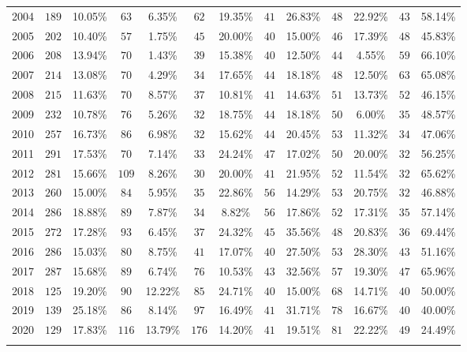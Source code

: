 \begin{table}[!htbp]
\begin{tabular}{@{\extracolsep{2pt}} ccccccccccccc}
2004 & $189$ & 10.05\% & $63$ & 6.35\% & $62$ & 19.35\% & $41$ & 26.83\% & $48$ & 22.92\% & $43$ & 58.14\% \\ 
2005 & $202$ & 10.40\% & $57$ & 1.75\% & $45$ & 20.00\% & $40$ & 15.00\% & $46$ & 17.39\% & $48$ & 45.83\% \\ 
2006 & $208$ & 13.94\% & $70$ & 1.43\% & $39$ & 15.38\% & $40$ & 12.50\% & $44$ & 4.55\% & $59$ & 66.10\% \\ 
2007 & $214$ & 13.08\% & $70$ & 4.29\% & $34$ & 17.65\% & $44$ & 18.18\% & $48$ & 12.50\% & $63$ & 65.08\% \\ 
2008 & $215$ & 11.63\% & $70$ & 8.57\% & $37$ & 10.81\% & $41$ & 14.63\% & $51$ & 13.73\% & $52$ & 46.15\% \\ 
2009 & $232$ & 10.78\% & $76$ & 5.26\% & $32$ & 18.75\% & $44$ & 18.18\% & $50$ & 6.00\% & $35$ & 48.57\% \\ 
2010 & $257$ & 16.73\% & $86$ & 6.98\% & $32$ & 15.62\% & $44$ & 20.45\% & $53$ & 11.32\% & $34$ & 47.06\% \\ 
2011 & $291$ & 17.53\% & $70$ & 7.14\% & $33$ & 24.24\% & $47$ & 17.02\% & $50$ & 20.00\% & $32$ & 56.25\% \\ 
2012 & $281$ & 15.66\% & $109$ & 8.26\% & $30$ & 20.00\% & $41$ & 21.95\% & $52$ & 11.54\% & $32$ & 65.62\% \\ 
2013 & $260$ & 15.00\% & $84$ & 5.95\% & $35$ & 22.86\% & $56$ & 14.29\% & $53$ & 20.75\% & $32$ & 46.88\% \\ 
2014 & $286$ & 18.88\% & $89$ & 7.87\% & $34$ & 8.82\% & $56$ & 17.86\% & $52$ & 17.31\% & $35$ & 57.14\% \\ 
2015 & $272$ & 17.28\% & $93$ & 6.45\% & $37$ & 24.32\% & $45$ & 35.56\% & $48$ & 20.83\% & $36$ & 69.44\% \\ 
2016 & $286$ & 15.03\% & $80$ & 8.75\% & $41$ & 17.07\% & $40$ & 27.50\% & $53$ & 28.30\% & $43$ & 51.16\% \\ 
2017 & $287$ & 15.68\% & $89$ & 6.74\% & $76$ & 10.53\% & $43$ & 32.56\% & $57$ & 19.30\% & $47$ & 65.96\% \\ 
2018 & $125$ & 19.20\% & $90$ & 12.22\% & $85$ & 24.71\% & $40$ & 15.00\% & $68$ & 14.71\% & $40$ & 50.00\% \\ 
2019 & $139$ & 25.18\% & $86$ & 8.14\% & $97$ & 16.49\% & $41$ & 31.71\% & $78$ & 16.67\% & $40$ & 40.00\% \\ 
2020 & $129$ & 17.83\% & $116$ & 13.79\% & $176$ & 14.20\% & $41$ & 19.51\% & $81$ & 22.22\% & $49$ & 24.49\% \\ 
\hline \\[-1.8ex] 
\end{tabular} 
\end{table} 
